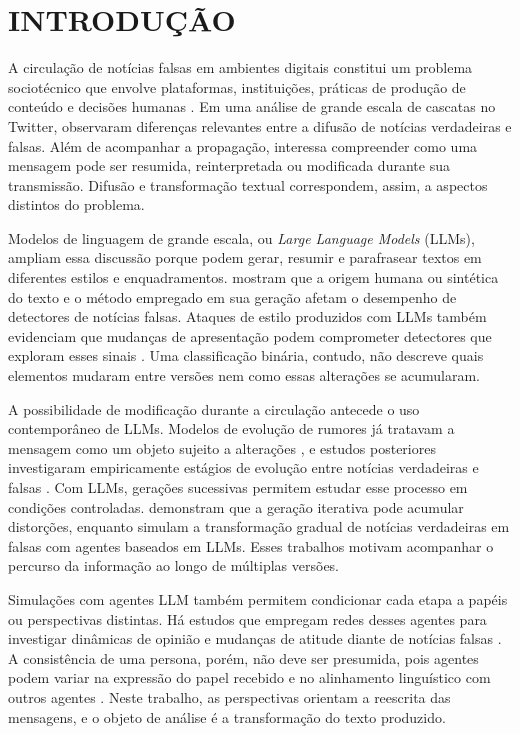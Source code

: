 \chapter{INTRODUÇÃO}
\label{ch:introducao}

A circulação de notícias falsas em ambientes digitais constitui um problema sociotécnico que envolve plataformas, instituições, práticas de produção de conteúdo e decisões humanas \cite{lazer2018science}. Em uma análise de grande escala de cascatas no Twitter,  observaram diferenças relevantes entre a difusão de notícias verdadeiras e falsas. Além de acompanhar a propagação, interessa compreender como uma mensagem pode ser resumida, reinterpretada ou modificada durante sua transmissão. Difusão e transformação textual correspondem, assim, a aspectos distintos do problema.

Modelos de linguagem de grande escala, ou \textit{Large Language Models} (LLMs), ampliam essa discussão porque podem gerar, resumir e parafrasear textos em diferentes estilos e enquadramentos.  mostram que a origem humana ou sintética do texto e o método empregado em sua geração afetam o desempenho de detectores de notícias falsas. Ataques de estilo produzidos com LLMs também evidenciam que mudanças de apresentação podem comprometer detectores que exploram esses sinais \cite{wu2024sheepdog}. Uma classificação binária, contudo, não descreve quais elementos mudaram entre versões nem como essas alterações se acumularam.

A possibilidade de modificação durante a circulação antecede o uso contemporâneo de LLMs. Modelos de evolução de rumores já tratavam a mensagem como um objeto sujeito a alterações \cite{zhang2013rumor}, e estudos posteriores investigaram empiricamente estágios de evolução entre notícias verdadeiras e falsas \cite{guo2021truth}. Com LLMs, gerações sucessivas permitem estudar esse processo em condições controladas.  demonstram que a geração iterativa pode acumular distorções, enquanto  simulam a transformação gradual de notícias verdadeiras em falsas com agentes baseados em LLMs. Esses trabalhos motivam acompanhar o percurso da informação ao longo de múltiplas versões.

Simulações com agentes LLM também permitem condicionar cada etapa a papéis ou perspectivas distintas. Há estudos que empregam redes desses agentes para investigar dinâmicas de opinião \cite{chuang2024opinion} e mudanças de atitude diante de notícias falsas \cite{liu2024skepticism}. A consistência de uma persona, porém, não deve ser presumida, pois agentes podem variar na expressão do papel recebido e no alinhamento linguístico com outros agentes \cite{frisch2024interaction}. Neste trabalho, as perspectivas orientam a reescrita das mensagens, e o objeto de análise é a transformação do texto produzido.

